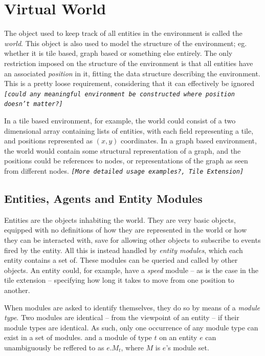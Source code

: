 
\section{Virtual World}

The object used to keep track of all entities in the environment is
called the \emph{world}. This object is also used to model the structure
of the environment; eg. whether it is tile based, graph based or something
else entirely. The only restriction imposed on the structure of the
environment is that all entities have an associated \emph{position}
in it, fitting the data structure describing the environment. This
is a pretty loose requirement, considering that it can effectively
be ignored \texttt{\emph{{[}could any meaningful environment be constructed
where position doesn't matter?{]}}}

In a tile based environment, for example, the world could consist
of a two dimensional array containing lists of entities, with each
field representing a tile, and positions represented as $(x,y)$ coordinates.
In a graph based environment, the world would contain some structural
representation of a graph, and the positions could be references to
nodes, or representations of the graph as seen from different nodes.
\texttt{\emph{{[}More detailed usage examples?, Tile Extension{]}}}


\subsection{Entities, Agents and Entity Modules\label{sub:SysFeatEntities}}

Entities are the objects inhabiting the world. They are very basic
objects, equipped with no definitions of how they are represented
in the world or how they can be interacted with, save for allowing
other objects to subscribe to events fired by the entity. All this
is instead handled by \emph{entity modules}, which each entity contains
a set of. These modules can be queried and called by other objects.
An entity could, for example, have a \emph{speed} module -- as is
the case in the tile extension -- specifying how long it takes to
move from one position to another.

When modules are asked to identify themselves, they do so by means
of a \emph{module type}. Two modules are identical -- from the viewpoint
of an entity -- if their module types are identical. As such, only
one occurrence of any module type can exist in a set of modules. and
a module of type $t$ on an entity $e$ can unambiguously be reffered
to as $e.M_{t}$, where $M$ is $e$'s module set. 

